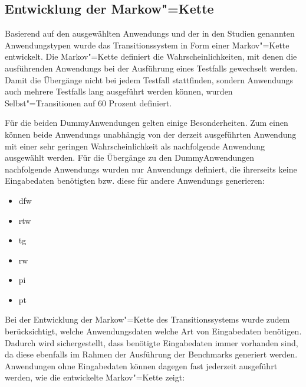 \subsection{Entwicklung der Markow"=Kette}
\label{subsec:markovChain}

Basierend auf den ausgewählten \glspl{Anwendung} und der in den Studien genannten Anwendungstypen wurde das Transitionssystem in Form einer Markov"=Kette entwickelt.
Die Markov"=Kette definiert die Wahrscheinlichkeiten, mit denen die ausführenden \glspl{Anwendung} bei der Ausführung eines Testfalls gewechselt werden.
Damit die Übergänge nicht bei jedem \gls{Testfall} stattfinden, sondern \glspl{Anwendung} auch mehrere \glspl{Testfall} lang ausgeführt werden können, wurden Selbst"=Transitionen auf 60 Prozent definiert.

Für die beiden Dummy\gls{Anwendung}en gelten einige Besonderheiten.
Zum einen können beide \glspl{Anwendung} unabhängig von der derzeit ausgeführten \gls{Anwendung} mit einer sehr geringen Wahrscheinlichkeit als nachfolgende \gls{Anwendung} ausgewählt werden.
Für die Übergänge zu den Dummy\gls{Anwendung}en nachfolgende \glspl{Anwendung} wurden nur \glspl{Anwendung} definiert, die ihrerseits keine Eingabedaten benötigten bzw. diese für andere \glspl{Anwendung} generieren:

\begin{itemize}
    \item \acrlong{dfw}
    \item \acrlong{rtw}
    \item \acrlong{tg}
    \item \acrlong{rw}
    \item \acrlong{pi}
    \item \acrlong{pt}
\end{itemize}

Bei der Entwicklung der Markow"=Kette des Transitionssystems wurde zudem berücksichtigt, welche Anwendungsdaten welche Art von Eingabedaten benötigen.
Dadurch wird sichergestellt, dass benötigte Eingabedaten immer vorhanden sind, da diese ebenfalls im Rahmen der Ausführung der Benchmarks generiert werden.
Anwendungen ohne Eingabedaten können dagegen fast jederzeit ausgeführt werden, wie die entwickelte Markov"=Kette zeigt:

